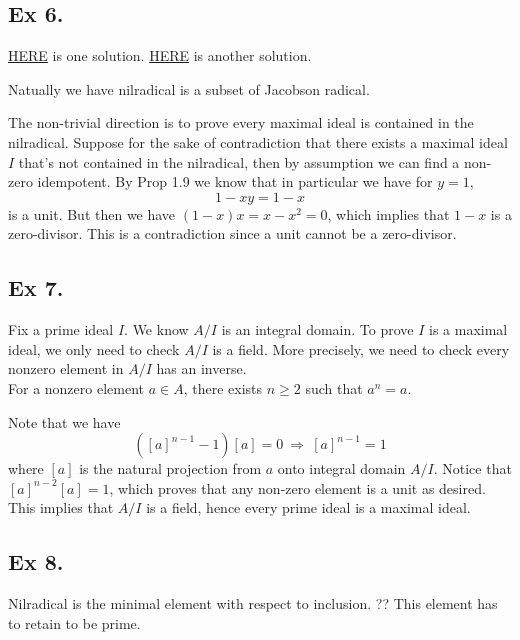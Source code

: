 \subsection{Ex 6.}

\href{https://math.stackexchange.com/questions/2816529/check-my-proof-that-the-nilradical-and-the-jacobson-radical-are-equal-am-1-6}{HERE} is one solution. \href{https://math.stackexchange.com/questions/925332/atiyah-macdonald-problem-6-of-chapter-1  }{HERE} is another solution.

Natually we have nilradical is a subset of Jacobson radical.

The non-trivial direction is to prove every maximal ideal is contained in the nilradical. Suppose for the sake of contradiction that there exists a maximal ideal $I$ that's not contained in the nilradical, then by assumption we can find a non-zero idempotent.
By Prop 1.9 we know that in particular we 
have for $y=1$,
$$1-xy=1-x$$ is a unit. But then we have $(1-x)x=x-x^2=0$, which implies that $1-x$ is a zero-divisor. This is a contradiction since a unit cannot be a zero-divisor. \

\subsection{Ex 7.}\label{Chap 1 Ex 7.}

Fix a prime ideal $I$.
We know $A/I$ is an integral domain. To prove $I$ is a maximal ideal, we only need to check $A/I$ is a field. More precisely, we need to check every nonzero element in $A/I$ has an inverse.\\

For a nonzero element $a\in A$, there exists $n\geq 2$ such that $a^n=a$.

Note that we have 
$$([a]^{n-1}-1)[a]=0 ~\Rightarrow~ [a]^{n-1}=1$$ where $[a]$ is the natural projection from $a$ onto integral domain $A/I$. Notice that $[a]^{n-2}[a]=1$, which proves that any non-zero element is a unit as desired. This implies that $A/I$ is a field, hence every prime ideal is a maximal ideal.

\newpage\subsection{Ex 8.}

Nilradical is the minimal element with respect to inclusion. ?? This element has to retain to be prime.\\

